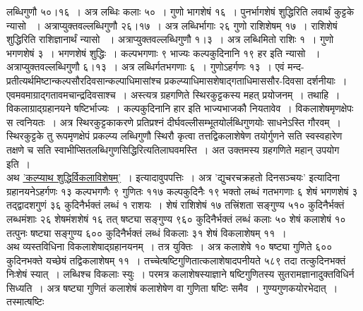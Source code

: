 \documentclass[11pt, openany]{book}
\begin{document}
\begin{sloppypar}
\noindent लब्धिगुणौ ५०।१६~। अत्र लब्धिः कलाः ५०~। गुणो भागशेषं १६~। पुनर्भागशेषं शुद्धिरिति लवार्थं कुट्टके न्यासो ~। अत्राप्युक्तवल्लब्धिगुणौ २६।१७~। अत्र लब्धिर्भागाः २६ गुणो राशिशेषम् १७~। राशिशेषं शुद्धिरिति राशिज्ञानार्थं न्यासो ~। अत्राप्युक्तवल्लब्धिगुणौ १।३~। अत्र लब्धिमितो राशिः १~। गुणो भगणशेषं ३~। भगणशेषं शुद्धिः~। कल्पभगणाः ९ भाज्यः कल्पकुदिनानि १९ हर इति न्यासो ~। अत्राप्युक्तवल्लब्धिगुणौ ६।१३~। अत्र लब्धिर्गतभगणाः ६~। गुणोऽहर्गणः १३~। एवं मन्द-प्रतीत्यर्थमिष्टान्कल्पसौरदिवसान्कल्पाधिमासांश्च प्रकल्प्याधिमासशेषाद्गताधिमाससौर-दिवसा दर्शनीयाः~। एवमवमाग्राद्गतावमचान्द्रदिवसाश्च~। अस्त्यत्र ग्रहगणिते स्थिरकुट्टकस्य महत् प्रयोजनम्~। तथाहि~। विकलाग्राद्ग्रहानयने षष्टिर्भाज्यः~। कल्पकुदिनानि हार इति भाज्यभाजकौ नियतावेव~। विकलाशेषमृणक्षेपः स त्वनियतः~। अत्र स्थिरकुट्टकाकरणे प्रतिप्रश्नं दीर्घवल्लीसम्भूतयोर्लब्धिगुणयोः साधनेऽस्ति गौरवम्~। स्थिरकुट्टके तु रूपमृणक्षेपं प्रकल्प्य लब्धिगुणौ स्थिरौ कृत्वा तत्तद्विकलाशेषेण तयोर्गुणने सति स्वस्वहारेण तक्षणे च सति स्वाभीप्सितलब्धिगुणसिद्धिरित्यतिलाघवमस्ति~। अत उक्तमस्य ग्रहगणिते महान् उपयोग इति~।\\

अथ \hyperref[5.67]{'कल्प्याथ शुद्धिर्विकलाविशेषम्'}~। इत्यादावुपपत्तिः~। अत्र {\color{violet}'द्युचरचक्रहतो दिनसञ्चयः'} इत्यादिना ग्रहानयनेऽहर्गणः १३ कल्पभगणैः ९ गुणितः ११७ कल्पकुदिनैः १९ भक्तो लब्धं गतभगणाः ६ शेषं भगणशेषं ३ तद्द्वादशगुणं ३६ कुदिनैर्भक्तं लब्धं १ राशयः~। शेषं राशिशेषं १७ तत्त्रिंशता सङ्गुण्य ५१० कुदिनैर्भक्तं लब्धमंशाः २६ शेषमंशशेषं १६ तत् षष्ट्या सङ्गुण्य ९६० कुदिनैर्भक्तं लब्धं कलाः ५० शेषं कलाशेषं १० तत्पुनः षष्ट्या सङ्गुण्य ६०० कुदिनैर्भक्तं लब्धं विकलाः ३१ शेषं विकलाशेषम् ११~।\\

अथ व्यस्तविधिना विकलाशेषाद्ग्रहानयनम्~। तत्र युक्तिः~। अत्र कलाशेषे १० षष्ट्या गुणिते ६०० कुदिनभक्ते यच्छेषं तद्विकलाशेषम् ११~। तच्चेत्षष्टिगुणितात्कलाशेषादपनीयते ५८९ तदा तत्कुदिनभक्तं निःशेषं स्यात्~। लब्धिश्च विकलाः स्युः~। परमत्र कलाशेषस्याज्ञाने षष्टिगुणितस्य सुतरामज्ञानादुक्तविधिर्न सिध्यति~। अत्र षष्ट्या गुणितं कलाशेषं कलाशेषेण वा गुणिता षष्टिः समैव~। गुण्यगुणकयोरभेदात्~। तस्मात्षष्टिः
\end{sloppypar}
\end{document}
